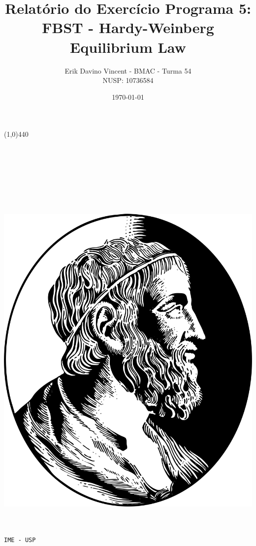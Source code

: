 \documentclass[pt12]{article}
\begin{document}
\begin{titlepage}

\title{\textbf{Relatório do Exercício Programa 5:\\FBST - Hardy-Weinberg Equilibrium Law}}
\author{Erik Davino Vincent - BMAC - Turma 54 \\ NUSP: 10736584}
\date{\today}
\maketitle
\line(1,0){440}
\ \\
\ \\
\ \\
\ \\
\ \\
\ \\
\ \\
\ \\
\begin{center}

\includegraphics[scale=0.1]{ime.png}\\
\ \\
\ \\
\begin{LARGE}\tt{IME - USP} \end{LARGE}


\end{center}

\end{titlepage}
\end{document}
